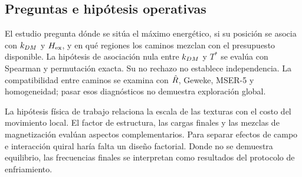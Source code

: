 \subsection{Preguntas e hipótesis operativas}

El estudio pregunta dónde se sitúa el máximo energético, si su posición se asocia con $k_{DM}$ y $H_{\mathrm{ex}}$, y en qué regiones los caminos mezclan con el presupuesto disponible. La hipótesis de asociación nula entre $k_{DM}$ y $T^*$ se evalúa con Spearman y permutación exacta. Su no rechazo no establece independencia. La compatibilidad entre caminos se examina con $\hat R$, Geweke, MSER-5 y homogeneidad; pasar esos diagnósticos no demuestra exploración global.

La hipótesis física de trabajo relaciona la escala de las texturas con el costo del movimiento local. El factor de estructura, las cargas finales y las mezclas de magnetización evalúan aspectos complementarios. Para separar efectos de campo e interacción quiral haría falta un diseño factorial. Donde no se demuestra equilibrio, las frecuencias finales se interpretan como resultados del protocolo de enfriamiento.
